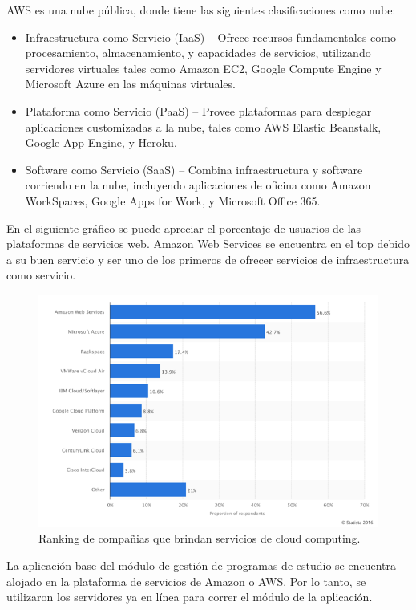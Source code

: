 AWS es una nube pública, donde tiene las siguientes clasificaciones como nube:
\begin{itemize}
	\item Infraestructura como Servicio (IaaS) – Ofrece recursos fundamentales como procesamiento, almacenamiento, y capacidades de servicios, utilizando servidores virtuales tales como Amazon EC2, Google Compute Engine y Microsoft Azure en las máquinas virtuales.
	\item Plataforma como Servicio (PaaS) – Provee plataformas para desplegar aplicaciones customizadas a la nube, tales como AWS Elastic Beanstalk, Google App Engine, y Heroku.
	\item Software como Servicio (SaaS) – Combina infraestructura y software corriendo en la nube, incluyendo aplicaciones de oficina como Amazon WorkSpaces, Google Apps for Work, y Microsoft Office 365.
\end{itemize}

En el siguiente gráfico se puede apreciar el porcentaje de usuarios de las plataformas de servicios web. Amazon Web Services se encuentra en el top debido a su buen servicio y ser uno de los primeros de ofrecer servicios de infraestructura como servicio.

\begin{figure}[H]
\centering
\includegraphics[width=125mm,scale=1]{Figuras/tecnologias/rank_cloud}
\caption{Ranking de compañias que brindan servicios de cloud computing.}
  \label{graph_cloud}
\end{figure}

La aplicación base del módulo de gestión de programas de estudio se encuentra alojado en la plataforma de servicios de Amazon o AWS. Por lo tanto, se utilizaron los servidores ya en línea para correr el módulo de la aplicación.

